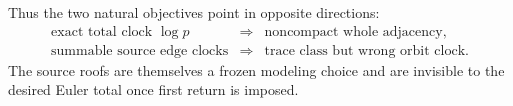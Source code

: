 Thus the two natural objectives point in opposite directions:
\begin{equation}
\begin{array}{ccl}
\text{exact total clock }\log p
&\Longrightarrow&\text{noncompact whole adjacency},\\[2pt]
\text{summable source edge clocks}
&\Longrightarrow&\text{trace class but wrong orbit clock}.
\end{array}
\label{eq:clock-dichotomy}
\end{equation}
The source roofs are themselves a frozen modeling choice and are invisible to
the desired Euler total once first return is imposed.
